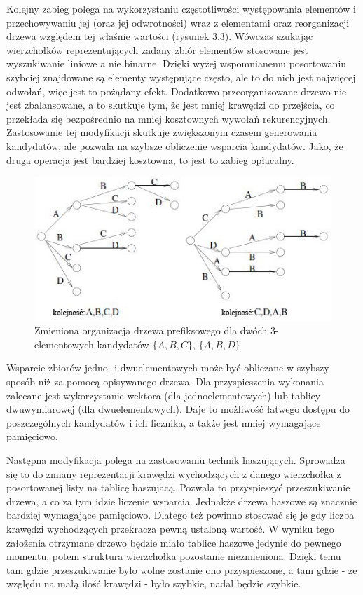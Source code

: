 Kolejny zabieg polega na wykorzystaniu częstotliwości występowania elementów i przechowywaniu jej (oraz jej odwrotności) wraz z elementami oraz reorganizacji drzewa względem tej właśnie wartości (rysunek 3.3). Wówczas szukając wierzchołków reprezentujących zadany zbiór elementów stosowane jest wyszukiwanie liniowe a nie binarne. Dzięki wyżej wspomnianemu posortowaniu szybciej znajdowane są elementy występujące często, ale to do nich jest najwięcej odwołań, więc jest to pożądany efekt. Dodatkowo przeorganizowane drzewo nie jest zbalansowane, a to skutkuje tym, że jest mniej krawędzi do przejścia, co przekłada się bezpośrednio na mniej kosztownych wywołań rekurencyjnych. Zastosowanie tej modyfikacji skutkuje zwiększonym czasem generowania kandydatów, ale pozwala na szybsze obliczenie wsparcia kandydatów. Jako, że druga operacja jest bardziej kosztowna, to jest to zabieg opłacalny.
\begin{figure}[h]
	\centering
	\includegraphics[width=0.8\linewidth]{figures/reorderedTreeBodon}
	\caption[Rysunek 3.3]{Zmieniona organizacja drzewa prefiksowego dla dwóch 3-elementowych kandydatów \(\{A, B, C\}\), \(\{A, B, D\}\)}
	\label{fig:reorderedTreeBodon}
\end{figure}


Wsparcie zbiorów jedno- i dwuelementowych może być obliczane w szybszy sposób niż za pomocą opisywanego drzewa. Dla przyspieszenia wykonania zalecane jest wykorzystanie wektora (dla jednoelementowych) lub tablicy dwuwymiarowej (dla dwuelementowych). Daje to możliwość łatwego dostępu do poszczególnych kandydatów i ich licznika, a także jest mniej wymagające pamięciowo. 

Następna modyfikacja polega na zastosowaniu technik haszujących. Sprowadza się to do zmiany reprezentacji krawędzi wychodzących z danego wierzchołka z posortowanej listy na tablicę haszujacą. Pozwala to przyspieszyć przeszukiwanie drzewa, a co za tym idzie liczenie wsparcia. Jednakże drzewa haszowe są znacznie bardziej wymagające pamięciowo. Dlatego też powinno stosować się je gdy liczba krawędzi wychodzących przekracza pewną ustaloną wartość. W wyniku tego założenia otrzymane drzewo będzie miało tablice haszowe jedynie do pewnego momentu, potem struktura wierzchołka pozostanie niezmieniona. Dzięki temu tam gdzie przeszukiwanie było wolne zostanie ono przyspieszone, a tam gdzie - ze względu na małą ilość krawędzi - było szybkie, nadal będzie szybkie. 

